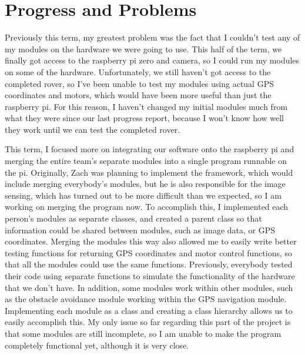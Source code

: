 \documentclass[10pt,letterpaper,onecolumn,journal]{IEEEtran}
\begin{document}
\section{Progress and Problems}
Previously this term, my greatest problem was the fact that I couldn't test any of my modules on the hardware we were going to use. This half of the term, we finally got access to the raspberry pi zero and camera, so I could run my modules on some of the hardware. Unfortunately, we still haven't got access to the completed rover, so I've been unable to test my modules using actual GPS coordinates and motors, which would have been more useful than just the raspberry pi. For this reason, I haven't changed my initial modules much from what they were since our last progress report, because I won't know how well they work until we can test the completed rover.\vspace{.3cm}
\par
This term, I focused more on integrating our software onto the raspberry pi and merging the entire team's separate modules into a single program runnable on the pi. Originally, Zach was planning to implement the framework, which would include merging everybody's modules, but he is also responsible for the image sensing, which has turned out to be more difficult than we expected, so I am working on merging the program now. To accomplish this, I implemented each person's modules as separate classes, and created a parent class so that information could be shared between modules, such as image data, or GPS coordinates. Merging the modules this way also allowed me to easily write better testing functions for returning GPS coordinates and motor control functions, so that all the modules could use the same functions. Previously, everybody tested their code using separate functions to simulate the functionality of the hardware that we don’t have. In addition, some modules work within other modules, such as the obstacle avoidance module working within the GPS navigation module. Implementing each module as a class and creating a class hierarchy allows us to easily accomplish this. My only issue so far regarding this part of the project is that some modules are still incomplete, so I am unable to make the program completely functional yet, although it is very close.\vspace{.3cm}
\par
\end{document}
